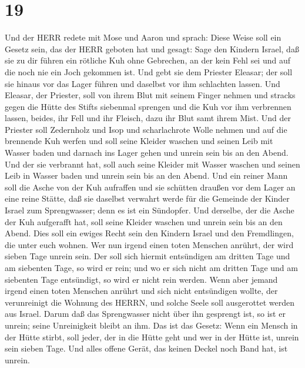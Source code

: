 \hypertarget{section-18}{%
\section{19}\label{section-18}}

 Und der HERR redete mit Mose und Aaron und sprach:
 Diese Weise soll ein Gesetz sein, das der HERR geboten hat
und gesagt: Sage den Kindern Israel, daß sie zu dir führen ein rötliche
Kuh ohne Gebrechen, an der kein Fehl sei und auf die noch nie ein Joch
gekommen ist.  Und gebt sie dem Priester Eleasar; der soll
sie hinaus vor das Lager führen und daselbst vor ihm schlachten lassen.
 Und Eleasar, der Priester, soll von ihrem Blut mit seinem
Finger nehmen und stracks gegen die Hütte des Stifts siebenmal sprengen
 und die Kuh vor ihm verbrennen lassen, beides, ihr Fell und
ihr Fleisch, dazu ihr Blut samt ihrem Mist.  Und der
Priester soll Zedernholz und Isop und scharlachrote Wolle nehmen und auf
die brennende Kuh werfen  und soll seine Kleider waschen und
seinen Leib mit Wasser baden und darnach ins Lager gehen und unrein sein
bis an den Abend.  Und der sie verbrannt hat, soll auch
seine Kleider mit Wasser waschen und seinen Leib in Wasser baden und
unrein sein bis an den Abend.  Und ein reiner Mann soll die
Asche von der Kuh aufraffen und sie schütten draußen vor dem Lager an
eine reine Stätte, daß sie daselbst verwahrt werde für die Gemeinde der
Kinder Israel zum Sprengwasser; denn es ist ein Sündopfer. 
Und derselbe, der die Asche der Kuh aufgerafft hat, soll seine Kleider
waschen und unrein sein bis an den Abend. Dies soll ein ewiges Recht
sein den Kindern Israel und den Fremdlingen, die unter euch wohnen.
 Wer nun irgend einen toten Menschen anrührt, der wird
sieben Tage unrein sein.  Der soll sich hiermit entsündigen
am dritten Tage und am siebenten Tage, so wird er rein; und wo er sich
nicht am dritten Tage und am siebenten Tage entsündigt, so wird er nicht
rein werden.  Wenn aber jemand irgend einen toten Menschen
anrührt und sich nicht entsündigen wollte, der verunreinigt die Wohnung
des HERRN, und solche Seele soll ausgerottet werden aus Israel. Darum
daß das Sprengwasser nicht über ihn gesprengt ist, so ist er unrein;
seine Unreinigkeit bleibt an ihm.  Das ist das Gesetz: Wenn
ein Mensch in der Hütte stirbt, soll jeder, der in die Hütte geht und
wer in der Hütte ist, unrein sein sieben Tage.  Und alles
offene Gerät, das keinen Deckel noch Band hat, ist unrein. 
